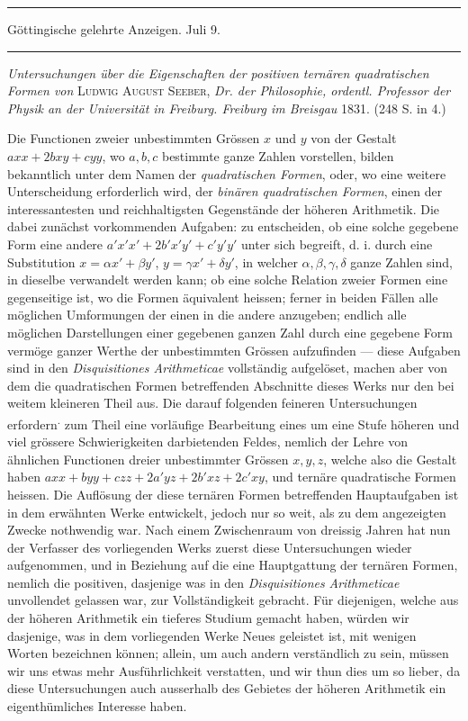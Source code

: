 \begin{center}
\rule{.86\linewidth}{.3pt}\par
Göttingische gelehrte Anzeigen. Juli 9.\par
\rule{.86\linewidth}{.3pt}
\end{center}
\emph{Untersuchungen über die Eigenschaften der positiven ternären quadratischen Formen von} \textsc{Ludwig August Seeber}, \emph{Dr. der Philosophie, ordentl. Professor der Physik an der Universität in Freiburg. Freiburg im Breisgau} 1831. (248 S. in 4.)

Die Functionen zweier unbestimmten Grössen $x$ und $y$ von der Gestalt $axx+2bxy+cyy$, wo $a,b,c$ bestimmte ganze Zahlen vorstellen, bilden bekanntlich unter dem Namen der \emph{quadratischen Formen}, oder, wo eine weitere Unterscheidung erforderlich wird, der \emph{binären quadratischen Formen}, einen der interessantesten und reichhaltigsten Gegenstände der höheren Arithmetik. Die dabei zunächst vorkommenden Aufgaben: zu entscheiden, ob eine solche gegebene Form eine andere $a'x'x'+2b'x'y'+c'y'y'$ unter sich begreift, d. i. durch eine Substitution $x=\alpha x'+\beta y'$, $y=\gamma x'+\delta y'$, in welcher $\alpha,\beta,\gamma,\delta$ ganze Zahlen sind, in dieselbe verwandelt werden kann; ob eine solche Relation zweier Formen eine gegenseitige ist, wo die Formen äquivalent heissen; ferner in beiden Fällen alle möglichen Umformungen der einen in die andere anzugeben; endlich alle möglichen Darstellungen einer gegebenen ganzen Zahl durch eine gegebene Form vermöge ganzer Werthe der unbestimmten Grössen aufzufinden --- diese Aufgaben sind in den \emph{Disquisitiones Arithmeticae} vollständig aufgelöset, machen aber von dem die quadratischen Formen betreffenden Abschnitte dieses Werks nur den bei weitem kleineren Theil aus. Die darauf folgenden feineren Untersuchungen erfordern\textsuperscript{.} zum Theil eine vorläufige Bearbeitung eines um eine Stufe höheren und viel grössere Schwierigkeiten darbietenden Feldes, nemlich der Lehre von ähnlichen Functionen dreier unbestimmter Grössen $x,y,z$, welche also die Gestalt haben $axx+byy+czz+2a'yz+2b'xz+2c'xy$, und ternäre quadratische Formen heissen. Die Auflösung der diese ternären Formen betreffenden Hauptaufgaben ist in dem erwähnten Werke entwickelt, jedoch nur so weit, als zu dem angezeigten Zwecke nothwendig war. Nach einem Zwischenraum von dreissig Jahren hat nun der Verfasser des vorliegenden Werks zuerst diese Untersuchungen wieder aufgenommen, und in Beziehung auf die eine Hauptgattung der ternären Formen, nemlich die positiven, dasjenige was in den \emph{Disquisitiones }
\emph{Arithmeticae} unvollendet gelassen war, zur Vollständigkeit gebracht. Für diejenigen, welche aus der höheren Arithmetik ein tieferes Studium gemacht haben, würden wir dasjenige, was in dem vorliegenden Werke Neues geleistet ist, mit wenigen Worten bezeichnen können; allein, um auch andern verständlich zu sein, müssen wir uns etwas mehr Ausführlichkeit verstatten, und wir thun dies um so lieber, da diese Untersuchungen auch ausserhalb des Gebietes der höheren Arithmetik ein eigenthümliches Interesse haben.

